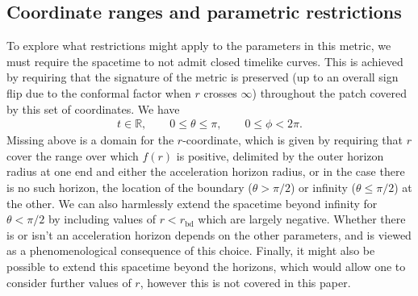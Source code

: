 \documentclass[
twoside,openright,frontopenright]{dmathesis}
\newcommand{\bd}{\mathrm{bd}}
\begin{document}
\subsection{Coordinate ranges and parametric restrictions}
\label{sec:parameters}
To explore what restrictions might apply to the parameters in this metric, we
must require the spacetime to not admit closed timelike curves. This is achieved
by requiring that the signature of the metric is preserved (up to an overall
sign flip due to the conformal factor when $r$ crosses $\infty$) throughout the
patch covered by this set of coordinates. We have
\begin{gather}
t\in\mathbb{R}, \qquad 0\leqslant\theta\leqslant\pi, \qquad 0\leqslant \phi<2\pi.
\end{gather}
Missing above is a domain for the $r$-coordinate, which is given by requiring
that $r$ cover the range over which $f(r)$ is positive, delimited by the outer
horizon radius at one end and either the acceleration horizon radius, or in the
case there is no such horizon, the location of the boundary ($\theta>\pi/2$) or
infinity ($\theta\leqslant\pi/2$) at the other. We can also harmlessly extend
the spacetime beyond infinity for $\theta<\pi/2$ by including values of
$r<r_\bd$ which are largely negative. Whether there is or isn't an acceleration
horizon depends on the other parameters, and is viewed as a phenomenological
consequence of this choice. Finally, it might also be possible to extend this
spacetime beyond the horizons, which would allow one to consider further values
of $r$, however this is not covered in this paper.
\end{document}
